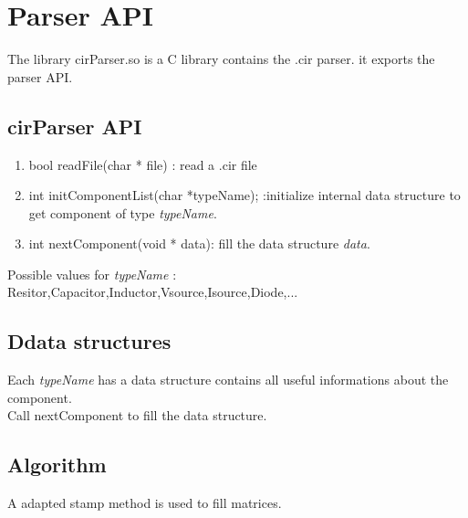 \documentclass[10pt]{article}
\begin{document}
\section{Parser API}
The library cirParser.so is a C library contains the .cir parser. it exports the parser API.\\

\subsection{cirParser API}

\begin{enumerate}
  \item bool readFile(char * file) : read a .cir file\\
  \item int initComponentList(char *typeName); :initialize internal data structure to get component of type \textit{typeName}.\\
  \item int nextComponent(void * data): fill the data structure \textit{data}.\\
\end{enumerate}

Possible values for \textit{typeName} : Resitor,Capacitor,Inductor,Vsource,Isource,Diode,...

\subsection{Ddata structures}
Each \textit{typeName} has a data structure contains all useful informations about the component.\\
Call nextComponent to fill the data structure.\\

\subsection{Algorithm}
A adapted stamp method is used to fill matrices.


 
\end{document}
